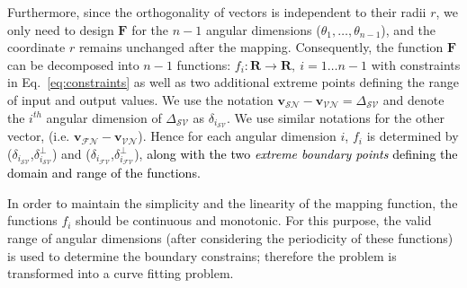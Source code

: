 Furthermore, since the orthogonality of vectors is independent to their radii $r$, we only need to design $\mathbf{F}$ for the $n-1$ angular dimensions ($\theta_1,\dots,\theta_{n-1}$), and the coordinate $r$ remains unchanged after the mapping. Consequently, the function $\mathbf{F}$ can be decomposed into $n-1$ functions: $f_i: \mathbf{R}\to \mathbf{R},~i=1\dots n-1$ with constraints in Eq.~\ref{eq:constraints} as well as two additional extreme points defining the range of input and output values. %
We use the notation $\mathbf{v}_{\mathcal{SN}} - \mathbf{v}_{\mathcal{VN}} = \Delta_{\mathcal{SV}}$ and denote the $i^{th}$ angular dimension of $\Delta_{\mathcal{SV}}$ as $\delta_{i_{{\mathcal{SV}}}}$. We use similar notations for the other vector, (i.e. $\mathbf{v}_{\mathcal{FN}} - \mathbf{v}_{\mathcal{VN}}$). %
Hence for each angular dimension $i$, $f_i$ is determined by ($\delta_{i_{{\mathcal{SV}}}}$,$\delta^{\perp}_{i_{{\mathcal{SV}}}}$) and ($\delta_{i_{{\mathcal{FV}}}}$,$\delta^{\perp}_{i_{{\mathcal{FV}}}}$), \textcolor{black}{along with the two \textit{extreme boundary points} defining the domain and range of the functions.}




In order to maintain the simplicity and the linearity of the mapping function, the functions $f_i$ should be continuous and monotonic. For this purpose, the 
valid range of angular dimensions (after considering the periodicity of these functions) is used to determine the boundary constrains; therefore the problem is transformed into a curve fitting problem. 

